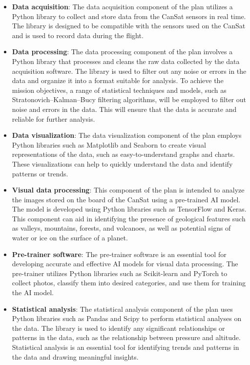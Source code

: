\documentclass[11pt]{article}
\begin{document}
\begin{itemize}[leftmargin=1cm,itemindent=0.5cm, noitemsep, topsep=0pt]
    \item \textbf{Data acquisition}: The data acquisition component of the plan utilizes a Python library to collect and store data from the CanSat sensors in real time. The library is designed to be compatible with the sensors used on the CanSat and is used to record data during the flight.
    \item \textbf{Data processing}: The data processing component of the plan involves a Python library that processes and cleans the raw data collected by the data acquisition software. The library is used to filter out any noise or errors in the data and organize it into a format suitable for analysis. To achieve the mission objectives, a range of statistical techniques and models, such as Stratonovich–Kalman–Bucy filtering algorithms, will be employed to filter out noise and errors in the data. This will ensure that the data is accurate and reliable for further analysis.
    \item \textbf{Data visualization}: The data visualization component of the plan employs Python libraries such as Matplotlib and Seaborn to create visual representations of the data, such as easy-to-understand graphs and charts. These visualizations can help to quickly understand the data and identify patterns or trends.
    \item \textbf{Visual data processing}: This component of the plan is intended to analyze the images stored on the board of the CanSat using a pre-trained AI model. The model is developed using Python libraries such as TensorFlow and Keras. This component can aid in identifying the presence of geological features such as valleys, mountains, forests, and volcanoes, as well as potential signs of water or ice on the surface of a planet.
    \item \textbf{Pre-trainer software}: The pre-trainer software is an essential tool for developing accurate and effective AI models for visual data processing. The pre-trainer utilizes Python libraries such as Scikit-learn and PyTorch to collect photos, classify them into desired categories, and use them for training the AI model.
    \item \textbf{Statistical analysis}: The statistical analysis component of the plan uses Python libraries such as Pandas and Scipy to perform statistical analyses on the data. The library is used to identify any significant relationships or patterns in the data, such as the relationship between pressure and altitude. Statistical analysis is an essential tool for identifying trends and patterns in the data and drawing meaningful insights.
\end{itemize}
\end{document}
